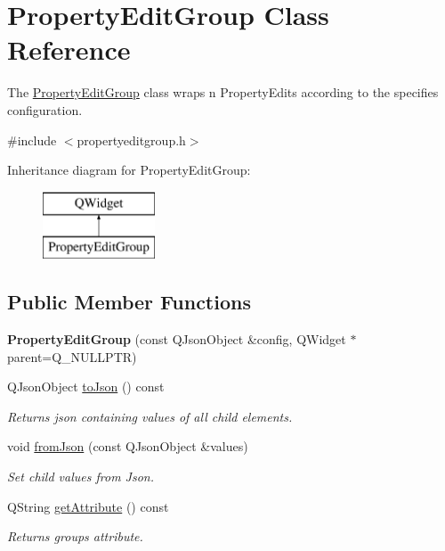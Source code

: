 \hypertarget{class_property_edit_group}{}\section{Property\+Edit\+Group Class Reference}
\label{class_property_edit_group}


The \mbox{\hyperlink{class_property_edit_group}{Property\+Edit\+Group}} class wraps n Property\+Edits according to the specifies configuration.  




{\ttfamily \#include $<$propertyeditgroup.\+h$>$}

Inheritance diagram for Property\+Edit\+Group\+:\begin{figure}[H]
\begin{center}
\leavevmode
\includegraphics[height=2.000000cm]{class_property_edit_group}
\end{center}
\end{figure}
\subsection*{Public Member Functions}
\begin{DoxyCompactItemize}
\item 
\mbox{\label{class_property_edit_group_a18e370044e616ade52f31ba90cc9652c}} 
{\bfseries Property\+Edit\+Group} (const Q\+Json\+Object \&config, Q\+Widget $\ast$parent=Q\+\_\+\+N\+U\+L\+L\+P\+TR)
\item 
Q\+Json\+Object \mbox{\hyperlink{class_property_edit_group_a8465118b18404dc711408268f992dc67}{to\+Json}} () const
\begin{DoxyCompactList}\small\item\em Returns json containing values of all child elements. \end{DoxyCompactList}\item 
void \mbox{\hyperlink{class_property_edit_group_ab67d4c9653391c01be0a094dcf33f750}{from\+Json}} (const Q\+Json\+Object \&values)
\begin{DoxyCompactList}\small\item\em Set child values from Json. \end{DoxyCompactList}\item 
Q\+String \mbox{\hyperlink{class_property_edit_group_a1f29d82fefe5673830f941dc88a9fca3}{get\+Attribute}} () const
\begin{DoxyCompactList}\small\item\em Returns groups attribute. \end{DoxyCompactList}\end{DoxyCompactItemize}


